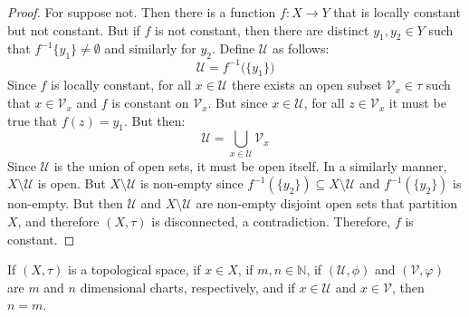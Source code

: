 \documentclass[oneside]{book}                                                  %
\begin{document}
            \begin{proof}
                For suppose not. Then there is a function $f:X\rightarrow{Y}$
                that is locally constant but not constant. But if $f$ is not
                constant, then there are distinct $y_{1},y_{2}\in{Y}$ such that
                $f^{\minus{1}}\{y_{1}\}\ne\emptyset$ and similarly for $y_{2}$.
                Define $\mathcal{U}$ as follows:
                \begin{equation}
                    \mathcal{U}=f^{\minus{1}}\big(\{y_{1}\}\big)
                \end{equation}
                Since $f$ is locally constant, for all $x\in\mathcal{U}$ there
                exists an open subset $\mathcal{V}_{x}\in\tau$ such that
                $x\in\mathcal{V}_{x}$ and $f$ is constant on $\mathcal{V}_{x}$.
                But since $x\in\mathcal{U}$, for all $z\in\mathcal{V}_{x}$ it
                must be true that $f(z)=y_{1}$. But then:
                \begin{equation}
                    \mathcal{U}=
                    \bigcup_{x\in\mathcal{U}}\mathcal{V}_{x}
                \end{equation}
                Since $\mathcal{U}$ is the union of open sets, it must be open
                itself. In a similarly manner, $X\setminus\mathcal{U}$ is open.
                But $X\setminus\mathcal{U}$ is non-empty since
                $f^{\minus{1}}(\{y_{2}\})\subseteq{X}\setminus\mathcal{U}$
                and $f^{\minus{1}}(\{y_{2}\})$ is non-empty. But then
                $\mathcal{U}$ and $X\setminus\mathcal{U}$ are non-empty disjoint
                open sets that partition $X$, and therefore $(X,\tau)$ is
                disconnected, a contradiction. Therefore, $f$ is constant.
            \end{proof}
            \begin{theorem}
                If $(X,\tau)$ is a topological space, if $x\in{X}$, if
                $m,n\in\mathbb{N}$, if $(\mathcal{U},\phi)$ and
                $(\mathcal{V},\varphi)$ are $m$ and $n$ dimensional charts,
                respectively, and if $x\in\mathcal{U}$ and $x\in\mathcal{V}$,
                then $n=m$.
            \end{theorem}
\end{document}
